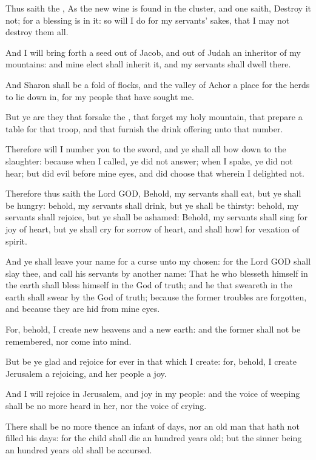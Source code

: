 \Verse Thus saith the \LORD, As the new wine is found in the cluster, and one saith, Destroy it not; for a blessing is in it: so will I do for my servants' sakes, that I may not destroy them all.

\Verse And I will bring forth a seed out of Jacob, and out of Judah an inheritor of my mountains: and mine elect shall inherit it, and my servants shall dwell there.

\Verse And Sharon shall be a fold of flocks, and the valley of Achor a place for the herds to lie down in, for my people that have sought me.

\Verse But ye are they that forsake the \LORD, that forget my holy mountain, that prepare a table for that troop, and that furnish the drink offering unto that number.

\Verse Therefore will I number you to the sword, and ye shall all bow down to the slaughter: because when I called, ye did not answer; when I spake, ye did not hear; but did evil before mine eyes, and did choose that wherein I delighted not.

\Verse Therefore thus saith the Lord GOD, Behold, my servants shall eat, but ye shall be hungry: behold, my servants shall drink, but ye shall be thirsty: behold, my servants shall rejoice, but ye shall be ashamed: \Verse Behold, my servants shall sing for joy of heart, but ye shall cry for sorrow of heart, and shall howl for vexation of spirit.

\Verse And ye shall leave your name for a curse unto my chosen: for the Lord GOD shall slay thee, and call his servants by another name: \Verse That he who blesseth himself in the earth shall bless himself in the God of truth; and he that sweareth in the earth shall swear by the God of truth; because the former troubles are forgotten, and because they are hid from mine eyes.

\Verse For, behold, I create new heavens and a new earth: and the former shall not be remembered, nor come into mind.

\Verse But be ye glad and rejoice for ever in that which I create: for, behold, I create Jerusalem a rejoicing, and her people a joy.

\Verse And I will rejoice in Jerusalem, and joy in my people: and the voice of weeping shall be no more heard in her, nor the voice of crying.

\Verse There shall be no more thence an infant of days, nor an old man that hath not filled his days: for the child shall die an hundred years old; but the sinner being an hundred years old shall be accursed.

